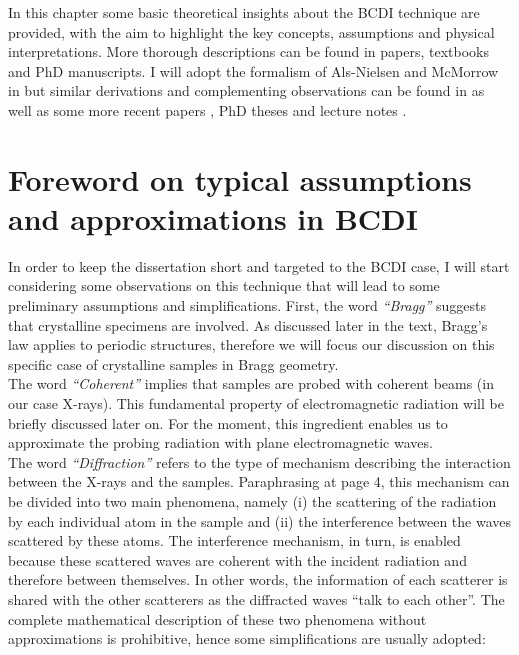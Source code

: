 
In this chapter some basic theoretical insights about the BCDI technique are provided, with the aim to highlight the key 
concepts, assumptions and physical interpretations. More thorough descriptions can be found in papers, textbooks 
and PhD manuscripts. I will adopt the formalism of Als-Nielsen and McMorrow in \cite{alsnielsen_mcmorrow2011} but similar 
derivations and complementing observations can be found in \cite{guinier1994, paganin2006coherent} as well as some more recent papers \cite{vartanyants2013coherentxraydiffractionimaging}, 
PhD theses \cite{dupraz:tel-01285735, girard:tel-02906931, Atlan2023} and lecture notes \cite{kirian2024dipole}. 

\section{Foreword on typical assumptions and approximations in BCDI}
In order to keep the dissertation short and targeted to the BCDI case, I will start considering some observations on this
technique that will lead to some preliminary assumptions and simplifications. First, the word \textit{``Bragg''} suggests that 
crystalline specimens are involved. As discussed later in the text, Bragg's law applies to periodic structures, therefore 
we will focus our discussion on this specific case of crystalline samples in Bragg geometry. \\
The word \textit{``Coherent''} implies that samples are probed with coherent beams (in our case X-rays). This fundamental property of 
electromagnetic radiation will be briefly discussed later on. For the moment, this ingredient enables us to approximate the 
probing radiation with plane electromagnetic waves. \\
The word \textit{``Diffraction''} refers to the type of mechanism describing the interaction between the X-rays and the 
samples. Paraphrasing \cite{guinier1994} at page 4, this mechanism can be divided into two main phenomena, namely (i) 
the scattering of the radiation by each individual atom in the sample and (ii) the interference between the waves scattered 
by these atoms. The interference mechanism, in turn, is enabled because these scattered waves are coherent with the incident 
radiation and therefore between themselves. In other words, the information of each scatterer is shared with the other scatterers 
as the diffracted waves ``talk to each other''. The complete mathematical description of these two phenomena without approximations 
is prohibitive, hence some simplifications are usually adopted: 
